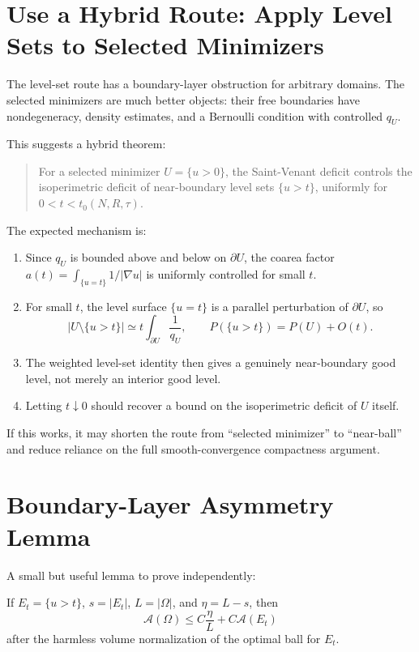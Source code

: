 \documentclass[11pt]{article}
\begin{document}
\section{Use a Hybrid Route: Apply Level Sets to Selected Minimizers}

The level-set route has a boundary-layer obstruction for arbitrary domains.
The selected minimizers are much better objects: their free boundaries have
nondegeneracy, density estimates, and a Bernoulli condition with controlled
\(q_U\).

This suggests a hybrid theorem:

\begin{quote}
For a selected minimizer \(U=\{u>0\}\), the Saint-Venant deficit controls the
isoperimetric deficit of near-boundary level sets \(\{u>t\}\), uniformly for
\(0<t<t_0(N,R,\tau)\).
\end{quote}

The expected mechanism is:
\begin{enumerate}
\item Since \(q_U\) is bounded above and below on \(\partial U\), the coarea
factor \(a(t)=\int_{\{u=t\}}1/|\nabla u|\) is uniformly controlled for small
\(t\).
\item For small \(t\), the level surface \(\{u=t\}\) is a parallel perturbation
of \(\partial U\), so
\[
|U\setminus\{u>t\}|\simeq t\int_{\partial U}\frac1{q_U},
\qquad
P(\{u>t\})=P(U)+O(t).
\]
\item The weighted level-set identity then gives a genuinely near-boundary good
level, not merely an interior good level.
\item Letting \(t\downarrow0\) should recover a bound on the isoperimetric
deficit of \(U\) itself.
\end{enumerate}
If this works, it may shorten the route from ``selected minimizer'' to
``near-ball'' and reduce reliance on the full smooth-convergence compactness
argument.

\section{Boundary-Layer Asymmetry Lemma}

A small but useful lemma to prove independently:

If \(E_t=\{u>t\}\), \(s=|E_t|\), \(L=|\Omega|\), and \(\eta=L-s\), then
\[
\mathcal A(\Omega)
\le
C\frac{\eta}{L}
+C\mathcal A(E_t)
\]
after the harmless volume normalization of the optimal ball for \(E_t\).
\end{document}
